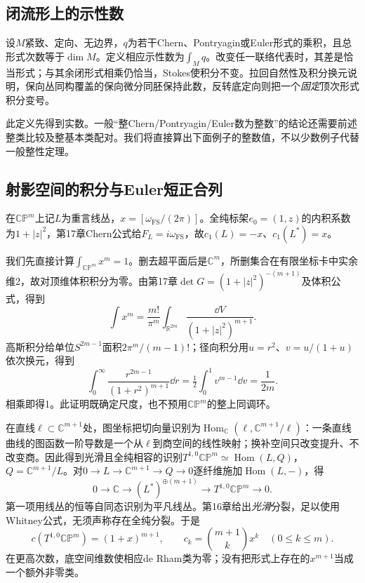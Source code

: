 \subsection{闭流形上的示性数}
设$M$紧致、定向、无边界，$q$为若干Chern、Pontryagin或Euler形式的乘积，且总形式次数等于$\dim M$。定义相应示性数为$\int_Mq$。改变任一联络代表时，其差是恰当形式；与其余闭形式相乘仍恰当，Stokes使积分不变。拉回自然性及积分换元说明，保向丛同构覆盖的保向微分同胚保持此数，反转底定向则把一个\emph{固定}顶次形式积分变号。

此定义先得到实数。一般“整Chern/Pontryagin/Euler数为整数”的结论还需要前述整类比较及整基本类配对。我们将直接算出下面例子的整数值，不以少数例子代替一般整性定理。

\subsection{射影空间的积分与Euler短正合列}
在$\mathbb{CP}^m$上记$L$为重言线丛，$x=[\omega_{\mathrm{FS}}/(2\pi)]$。全纯标架$e_0=(1,z)$的内积系数为$1+|z|^2$，第17章Chern公式给$F_L=i\omega_{\mathrm{FS}}$，故$c_1(L)=-x$、$c_1(L^*)=x$。

我们先直接计算$\int_{\mathbb{CP}^m}x^m=1$。删去超平面后是$\mathbb C^m$，所删集合在有限坐标卡中实余维2，故对顶维体积积分为零。由第17章$\det G=(1+|z|^2)^{-(m+1)}$及体积公式，得到
\[
 \int x^m=\frac{m!}{\pi^m}
 \int_{\mathbb R^{2m}}\frac{\dd V}{(1+|z|^2)^{m+1}}.
\]
高斯积分给单位$S^{2m-1}$面积$2\pi^m/(m-1)!$；径向积分用$u=r^2$、$v=u/(1+u)$依次换元，得到
\[
 \int_0^\infty\frac{r^{2m-1}}{(1+r^2)^{m+1}}\dd r
 =\tfrac12\int_0^1v^{m-1}\dd v=\frac1{2m}.
\]
相乘即得1。此证明既确定尺度，也不预用$\mathbb{CP}^m$的整上同调环。

在直线$\ell\subset\mathbb C^{m+1}$处，图坐标把切向量识别为$\operatorname{Hom}_{\mathbb C}(\ell,\mathbb C^{m+1}/\ell)$：一条直线曲线的图函数一阶导数是一个从$\ell$到商空间的线性映射；换补空间只改变提升、不改变商。因此得到光滑且全纯相容的识别$T^{1,0}\mathbb{CP}^m\simeq\operatorname{Hom}(L,Q)$，$Q=\mathbb C^{m+1}/L$。对$0\to L\to\mathbb C^{m+1}\to Q\to0$逐纤维施加$\operatorname{Hom}(L,-)$，得
\begin{equation}\label{eq:projective-euler-sequence}
 0\longrightarrow\mathbb C\longrightarrow(L^*)^{\oplus(m+1)}
 \longrightarrow T^{1,0}\mathbb{CP}^m\longrightarrow0.
\end{equation}
第一项用线丛的恒等自同态识别为平凡线丛。第16章给出\emph{光滑}分裂，足以使用Whitney公式，无须声称存在全纯分裂。于是
\begin{equation}\label{eq:projective-chern}
 c(T^{1,0}\mathbb{CP}^m)=(1+x)^{m+1},\qquad
 c_k=\binom{m+1}{k}x^k\quad(0\leq k\leq m).
\end{equation}
在更高次数，底空间维数使相应de Rham类为零；没有把形式上存在的$x^{m+1}$当成一个额外非零类。

